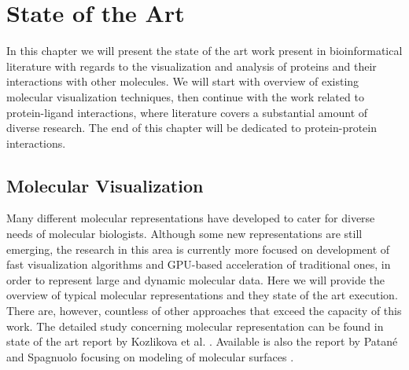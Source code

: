 \chapter{State of the Art}
\label{Sec:star}
In this chapter we will present the state of the art work present in bioinformatical literature with regards to the visualization and analysis of proteins and their interactions with other molecules. We will start with overview of existing molecular visualization techniques, then continue with the work related to protein-ligand interactions, where literature covers a substantial amount of diverse research. The end of this chapter will be dedicated to protein-protein interactions. 

\section{Molecular Visualization}
Many different molecular representations have developed to cater for diverse needs of molecular biologists. Although some new representations are still emerging, the research in this area is currently more focused on development of fast visualization algorithms and GPU-based acceleration of traditional ones, in order to represent large and dynamic molecular data. Here we will provide the overview of typical molecular representations and they state of the art execution. There are, however, countless of other approaches that exceed the capacity of this work. The detailed study concerning molecular representation can be found in state of the art report by Kozlikova et al. \cite{kozlikova2015visualization}. Available is also the report by Patané and Spagnuolo focusing on modeling of molecular surfaces \cite{patane2015state}.

